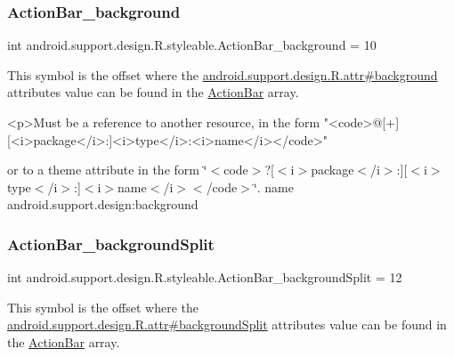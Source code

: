 \subsubsection{\texorpdfstring{Action\+Bar\+\_\+background}{ActionBar\_background}}
{\footnotesize\ttfamily int android.\+support.\+design.\+R.\+styleable.\+Action\+Bar\+\_\+background = 10\hspace{0.3cm}{\ttfamily [static]}}

This symbol is the offset where the \hyperlink{classandroid_1_1support_1_1design_1_1R_1_1attr_aeb618e21eef4362611649c7ca5a38343}{android.\+support.\+design.\+R.\+attr\#background} attribute\textquotesingle{}s value can be found in the \hyperlink{classandroid_1_1support_1_1design_1_1R_1_1styleable_ab795220a96557d11f8c21359b95bed82}{Action\+Bar} array.

\begin{DoxyVerb}      <p>Must be a reference to another resource, in the form "<code>@[+][<i>package</i>:]<i>type</i>:<i>name</i></code>"
\end{DoxyVerb}
 or to a theme attribute in the form \char`\"{}$<$code$>$?\mbox{[}$<$i$>$package$<$/i$>$\+:\mbox{]}\mbox{[}$<$i$>$type$<$/i$>$\+:\mbox{]}$<$i$>$name$<$/i$>$$<$/code$>$\char`\"{}.  name android.\+support.\+design\+:background \mbox{\label{classandroid_1_1support_1_1design_1_1R_1_1styleable_abdc8b34e1d44d2cbe5ba60c429ff7c24}} 
\subsubsection{\texorpdfstring{Action\+Bar\+\_\+background\+Split}{ActionBar\_backgroundSplit}}
{\footnotesize\ttfamily int android.\+support.\+design.\+R.\+styleable.\+Action\+Bar\+\_\+background\+Split = 12\hspace{0.3cm}{\ttfamily [static]}}

This symbol is the offset where the \hyperlink{classandroid_1_1support_1_1design_1_1R_1_1attr_a801eb11b48747bfa6b51d9658255cfec}{android.\+support.\+design.\+R.\+attr\#background\+Split} attribute\textquotesingle{}s value can be found in the \hyperlink{classandroid_1_1support_1_1design_1_1R_1_1styleable_ab795220a96557d11f8c21359b95bed82}{Action\+Bar} array.

